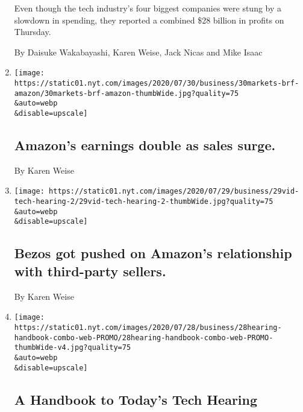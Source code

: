 \begin{enumerate}
  Even though the tech industry's four biggest companies were stung by a
  slowdown in spending, they reported a combined \$28 billion in profits
  on Thursday.

  By Daisuke Wakabayashi, Karen Weise, Jack Nicas and Mike Isaac
\item
  \href{/live/2020/07/30/business/stock-market-today-coronavirus/amazons-earnings-double-as-sales-surge}{}

  \texttt{[image: https://static01.nyt.com/images/2020/07/30/business/30markets-brf-amazon/30markets-brf-amazon-thumbWide.jpg?quality=75\\\&auto=webp\\\&disable=upscale]}

  \hypertarget{amazons-earnings-double-as-sales-surge}{%
  \subsection{Amazon's earnings double as sales
  surge.}\label{amazons-earnings-double-as-sales-surge}}

  By Karen Weise
\item
  \href{/live/2020/07/29/technology/tech-ceos-hearing-testimony/bezos-got-pushed-on-amazons-relationship-with-third-party-sellers}{}

  \texttt{[image: https://static01.nyt.com/images/2020/07/29/business/29vid-tech-hearing-2/29vid-tech-hearing-2-thumbWide.jpg?quality=75\\\&auto=webp\\\&disable=upscale]}

  \hypertarget{bezos-got-pushed-on-amazons-relationship-with-third-party-sellers}{%
  \subsection{Bezos got pushed on Amazon's relationship with third-party
  sellers.}\label{bezos-got-pushed-on-amazons-relationship-with-third-party-sellers}}

  By Karen Weise
\item
  \href{/2020/07/29/technology/tech-ceos-congress-what-to-know.html}{}

  \texttt{[image: https://static01.nyt.com/images/2020/07/28/business/28hearing-handbook-combo-web-PROMO/28hearing-handbook-combo-web-PROMO-thumbWide-v4.jpg?quality=75\\\&auto=webp\\\&disable=upscale]}

  \hypertarget{a-handbook-to-todays-tech-hearing}{%
  \subsection{A Handbook to Today's Tech
  Hearing}\label{a-handbook-to-todays-tech-hearing}}


\end{enumerate}
